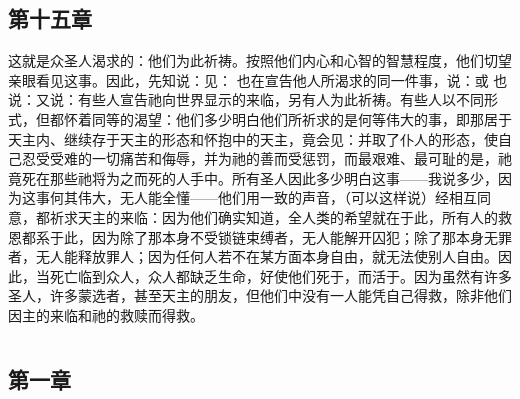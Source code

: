\subsection{第十五章}

\par

这就是众圣人渴求的：他们为此祈祷。按照他们内心和心智的智慧程度，他们切望亲眼看见这事。因此，先知说：见： 也在宣告他人所渴求的同一件事，说：或 也说：又说：有些人宣告祂向世界显示的来临，另有人为此祈祷。有些人以不同形式，但都怀着同等的渴望：他们多少明白他们所祈求的是何等伟大的事，即那居于天主内、继续存于天主的形态和怀抱中的天主，竟会见：并取了仆人的形态，使自己忍受受难的一切痛苦和侮辱，并为祂的善而受惩罚，而最艰难、最可耻的是，祂竟死在那些祂将为之而死的人手中。所有圣人因此多少明白这事——我说多少，因为这事何其伟大，无人能全懂——他们用一致的声音，（可以这样说）经相互同意，都祈求天主的来临：因为他们确实知道，全人类的希望就在于此，所有人的救恩都系于此，因为除了那本身不受锁链束缚者，无人能解开囚犯；除了那本身无罪者，无人能释放罪人；因为任何人若不在某方面本身自由，就无法使别人自由。因此，当死亡临到众人，众人都缺乏生命，好使他们死于，而活于。因为虽然有许多圣人，许多蒙选者，甚至天主的朋友，但他们中没有一人能凭自己得救，除非他们因主的来临和祂的救赎而得救。\par



\section{}


\subsection{第一章}

